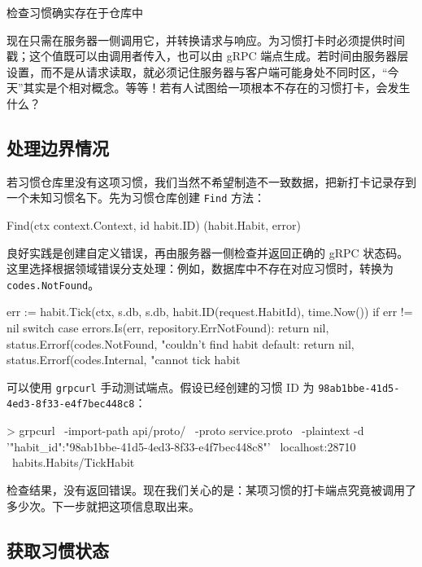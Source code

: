 \begin{codeannotations}
\item 检查习惯确实存在于仓库中
\end{codeannotations}

现在只需在服务器一侧调用它，并转换请求与响应。为习惯打卡时必须提供时间戳；这个值既可以由调用者传入，也可以由 gRPC 端点生成。若时间由服务器层设置，而不是从请求读取，就必须记住服务器与客户端可能身处不同时区，“今天”其实是个相对概念。等等！若有人试图给一项根本不存在的习惯打卡，会发生什么？

\subsection{处理边界情况}

若习惯仓库里没有这项习惯，我们当然不希望制造不一致数据，把新打卡记录存到一个未知习惯名下。先为习惯仓库创建 \texttt{Find} 方法：

\begin{gocode}[]
Find(ctx context.Context, id habit.ID) (habit.Habit, error)
\end{gocode}

良好实践是创建自定义错误，再由服务器一侧检查并返回正确的 gRPC 状态码。这里选择根据领域错误分支处理：例如，数据库中不存在对应习惯时，转换为 \texttt{codes.NotFound}。

\begin{gocode}[]
err := habit.Tick(ctx, s.db, s.db, habit.ID(request.HabitId), time.Now())
if err != nil {
    switch {
    case errors.Is(err, repository.ErrNotFound):
        return nil, status.Errorf(codes.NotFound,
            "couldn't find habit %
    default:
        return nil, status.Errorf(codes.Internal,
            "cannot tick habit %
    }
}
\end{gocode}

可以使用 \texttt{grpcurl} 手动测试端点。假设已经创建的习惯 ID 为 \texttt{98ab1bbe-41d5-4ed3-8f33-e4f7bec448c8}：

\begin{shellcode}[]
> grpcurl \
-import-path api/proto/ \
-proto service.proto \
-plaintext -d '{"habit_id":"98ab1bbe-41d5-4ed3-8f33-e4f7bec448c8"}' \
localhost:28710 \
habits.Habits/TickHabit
\end{shellcode}

检查结果，没有返回错误。现在我们关心的是：某项习惯的打卡端点究竟被调用了多少次。下一步就把这项信息取出来。

\subsection{获取习惯状态}

